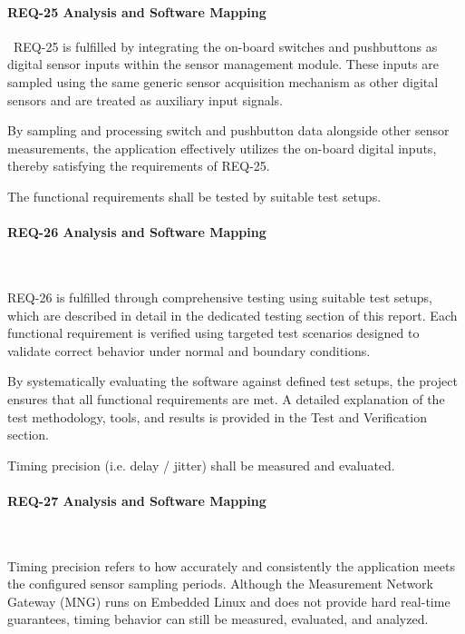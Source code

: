 \paragraph{REQ-25 Analysis and Software Mapping}\
REQ-25 is fulfilled by integrating the on-board switches and pushbuttons as digital 
sensor inputs within the sensor management module. These inputs are sampled using the 
same generic sensor acquisition mechanism as other digital sensors and are treated as 
auxiliary input signals.

By sampling and processing switch and pushbutton data alongside other sensor 
measurements, the application effectively utilizes the on-board digital inputs, 
thereby satisfying the requirements of REQ-25.

\begin{tcolorbox}[
    title=REQ-26,
    colback=gray!5,
    colframe=black,
    fonttitle=\bfseries
]
The functional requirements shall be tested by suitable test setups.
\end{tcolorbox}

\paragraph{REQ-26 Analysis and Software Mapping}\

REQ-26 is fulfilled through comprehensive testing using suitable test setups, which are 
described in detail in the dedicated testing section of this report. Each functional 
requirement is verified using targeted test scenarios designed to validate correct 
behavior under normal and boundary conditions.

By systematically evaluating the software against defined test setups, the project 
ensures that all functional requirements are met. A detailed explanation of the test 
methodology, tools, and results is provided in the Test and Verification section.


\begin{tcolorbox}[
    title=REQ-27,
    colback=gray!5,
    colframe=black,
    fonttitle=\bfseries
]
Timing precision (i.e. delay / jitter) shall be measured and evaluated.
\end{tcolorbox}

\paragraph{REQ-27 Analysis and Software Mapping}\

Timing precision refers to how accurately and consistently the application meets the configured sensor sampling periods.
Although the Measurement Network Gateway (MNG) runs on Embedded Linux and does not provide hard real-time guarantees, timing behavior can still be measured, evaluated, and analyzed.

